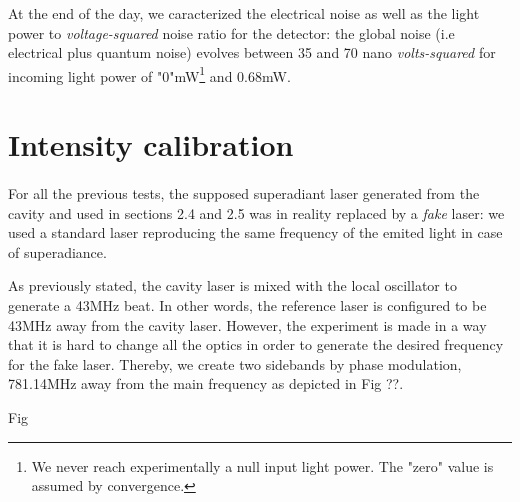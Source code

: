 \documentclass[12pt]{report}
\begin{document}
At the end of the day, we caracterized the electrical noise as well as the light power to \textit{voltage-squared} noise ratio for the detector: the global noise (i.e electrical plus quantum noise) evolves between 35 and 70 nano \textit{volts-squared} for incoming light power of "0"mW\footnote{We never reach experimentally a null input light power. The "zero" value is assumed by convergence.} and 0.68mW.

\section{Intensity calibration}
\paragraph{}

For all the previous tests, the supposed superadiant laser generated from the cavity and used in sections 2.4 and 2.5 was in reality replaced by a \textit{fake} laser: we used a standard laser reproducing the same frequency of the emited light in case of superadiance.

As previously stated, the cavity laser is mixed with the local oscillator to generate a 43MHz beat. In other words, the reference laser is configured to be 43MHz away from the cavity laser. However, the experiment is made in a way that it is hard to change all the optics in order to generate the desired frequency for the fake laser. Thereby, we create two sidebands by phase modulation, 781.14MHz away from the main frequency as depicted in Fig ??.

Fig
\end{document}
